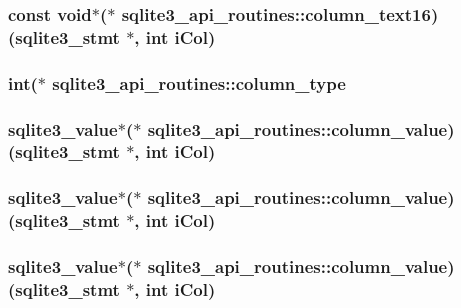 \subsubsection{\setlength{\rightskip}{0pt plus 5cm}const void$\ast$($\ast$ \bf{sqlite3\_\-api\_\-routines::column\_\-text16})(\bf{sqlite3\_\-stmt} $\ast$, int i\-Col)}\label{structsqlite3__api__routines_34fb619cd47d3bbed5ef71a891dcbe40}


\subsubsection{\setlength{\rightskip}{0pt plus 5cm}int($\ast$ \bf{sqlite3\_\-api\_\-routines::column\_\-type}}\label{structsqlite3__api__routines_8f23e72d2f07431b879ddebfd9d4c028}


\subsubsection{\setlength{\rightskip}{0pt plus 5cm}\bf{sqlite3\_\-value}$\ast$($\ast$ \bf{sqlite3\_\-api\_\-routines::column\_\-value})(\bf{sqlite3\_\-stmt} $\ast$, int i\-Col)}\label{structsqlite3__api__routines_c492f1d957bbe15d0fcf1d0b4a10eaff}


\subsubsection{\setlength{\rightskip}{0pt plus 5cm}\bf{sqlite3\_\-value}$\ast$($\ast$ \bf{sqlite3\_\-api\_\-routines::column\_\-value})(\bf{sqlite3\_\-stmt} $\ast$, int i\-Col)}\label{structsqlite3__api__routines_c492f1d957bbe15d0fcf1d0b4a10eaff}


\subsubsection{\setlength{\rightskip}{0pt plus 5cm}\bf{sqlite3\_\-value}$\ast$($\ast$ \bf{sqlite3\_\-api\_\-routines::column\_\-value})(\bf{sqlite3\_\-stmt} $\ast$, int i\-Col)}\label{structsqlite3__api__routines_c492f1d957bbe15d0fcf1d0b4a10eaff}


